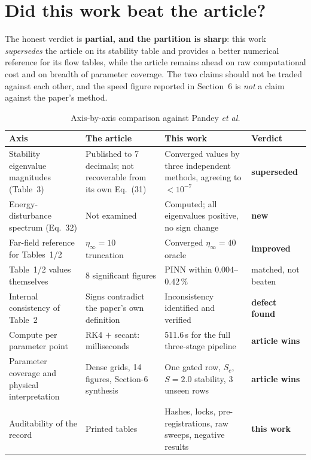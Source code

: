 \documentclass[11pt,a4paper]{article}
\newcommand{\pct}{\,\%}
\begin{document}
\section{Did this work beat the article?}
\label{sec:beat}

The honest verdict is \textbf{partial, and the partition is sharp}: this work
\emph{supersedes} the article on its stability table and provides a better numerical
reference for its flow tables, while the article remains ahead on raw computational cost
and on breadth of parameter coverage. The two claims should not be traded against each
other, and the speed figure reported in Section~6 is \emph{not} a claim against the paper's
method.

\begin{table}[ht]
\centering
\caption{Axis-by-axis comparison against Pandey \textit{et al.}}
\label{tab:beat}
\small
\begin{tabular}{@{}p{3.9cm}p{3.7cm}p{4.3cm}p{3.0cm}@{}}
\toprule
\textbf{Axis} & \textbf{The article} & \textbf{This work} & \textbf{Verdict} \\
\midrule
Stability eigenvalue magnitudes (Table~3)
  & Published to 7 decimals; not recoverable from its own Eq.~(31)
  & Converged values by three independent methods, agreeing to $<10^{-7}$
  & \textbf{superseded} \\
Energy-disturbance spectrum (Eq.~32)
  & Not examined
  & Computed; all eigenvalues positive, no sign change
  & \textbf{new} \\
Far-field reference for Tables~1/2
  & $\eta_\infty = 10$ truncation
  & Converged $\eta_\infty = 40$ oracle
  & \textbf{improved} \\
Table~1/2 values themselves
  & 8 significant figures
  & PINN within $0.004$--$0.42\pct$
  & matched, not beaten \\
Internal consistency of Table~2
  & Signs contradict the paper's own definition
  & Inconsistency identified and verified
  & \textbf{defect found} \\
Compute per parameter point
  & RK4 $+$ secant: milliseconds
  & 511.6\,s for the full three-stage pipeline
  & \textbf{article wins} \\
Parameter coverage and physical interpretation
  & Dense grids, 14 figures, Section-6 synthesis
  & One gated row, $S_c$, $S{=}2.0$ stability, 3 unseen rows
  & \textbf{article wins} \\
Auditability of the record
  & Printed tables
  & Hashes, locks, pre-registrations, raw sweeps, negative results
  & \textbf{this work} \\
\bottomrule
\end{tabular}
\end{table}
\end{document}
